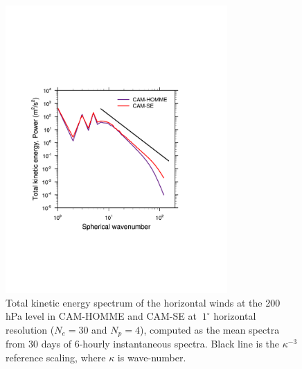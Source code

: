 \documentclass{agujournal}
\begin{document}
\begin{figure}[h]
\centering
\includegraphics[width=20pc]{figs/kespectra.pdf}
\caption{Total kinetic energy spectrum of the horizontal winds at the 200 hPa level in CAM-HOMME and CAM-SE at $~1^\circ$ horizontal resolution ($N_e=30$ and $N_p=4$), computed as the mean spectra from 30 days of 6-hourly instantaneous spectra. Black line is the ${\kappa}^{-3}$ reference scaling, where $\kappa$ is wave-number.}
\label{fig:kespectra}
\end{figure}
\end{document}
